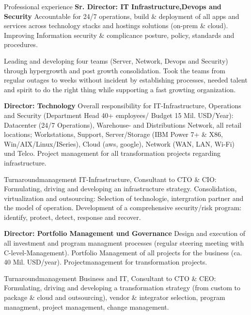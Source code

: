 \begin{rubric}{Professional experience}
\entry*[08/2015 - today] \textbf{Sr. Director: IT Infrastructure,Devops and Security}\newline
{} 
Accountable for 24/7 operations, build \& deployment of all apps and services across technology stacks and hostings solutions (on-prem \& cloud). Improving Information security \& complicance posture, policy, standards and procedures. 


Leading and developing four teams (Server, Network, Devops and Security) through hypergrowth and post growth consolidation. Took the teams from regular outages to weeks without incident by establishing processes, needed talent and spirit to do the right thing while supporting a fast growting organization. 

\entry*[04/2013 - 08/2015] \textbf{Director: Technology}\newline
{} 
Overall responsibility for IT-Infrastructure, Operations and Security (Department Head 40+ employees/ Budget 15 Mil. USD/Year): Datacenter (24/7 Operations), Warehouse- and Distributions Network, all retail locations; Workstations, Support, Server/Storage (IBM Power 7+ \& X86, Win/AIX/Linux/ISeries), Cloud (aws, google), Network (WAN, LAN, Wi-Fi) und Telco. Project management for all transformation projects regarding infrastructure.

Turnaroundmanagement IT-Infrastructure, Consultant to CTO \& CIO: Formulating, driving and developing an infrastructure strategy. Consolidation, virtualization and outsourcing: Selection of technologie, intergration partner and the model of operation. Development of a comprehensive security/risk program: identify, protect, detect, response and recover.

\entry*[10/2011 - 03/2013] \textbf{Director: Portfolio Management und Governance}\newline
{} 
Design and execution of all investment and program managment processes (regular steering meeting with C-level-Management). Portfolio Management of all projects for the business (ca. 40 Mil. USD/year). Projectmanagement for transformation projects.\axelvspace

Turnaroundmanagement Business and IT, Consultant to CTO \& CEO: Formulating, driving and developing a transformation strategy (from custom to package \& cloud and outsourcing), vendor \& integrator selection, program managment, project management, change management.\newline


\end{rubric}
